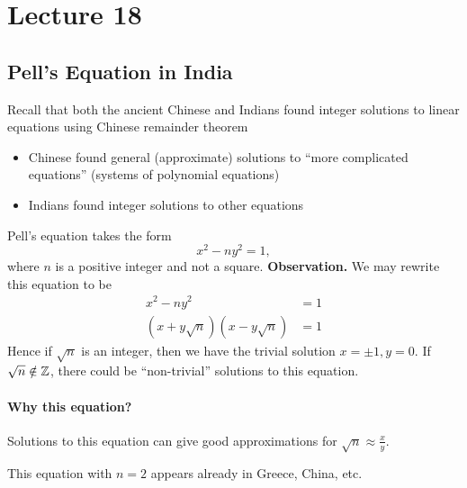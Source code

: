 \documentclass[class=article, crop=false]{standalone}
\begin{document}
  \section{Lecture 18}
  \subsection{Pell's Equation in India}
  Recall that both the ancient Chinese and Indians found integer solutions to linear equations using Chinese remainder theorem
  \begin{itemize}
    \item Chinese found general (approximate) solutions to ``more complicated equations'' (systems of polynomial equations)
    \item Indians found integer solutions to other equations
  \end{itemize}
  Pell's equation takes the form
  \[
    x^2 - ny^2 = 1,
  \]
  where $n$ is a positive integer and not a square.
  \textbf{Observation.} We may rewrite this equation to be
  \begin{align*}
    x^2 - ny^2 &= 1 \\
    (x + y\sqrt{n})(x - y\sqrt{n}) &= 1
  \end{align*}
  Hence if $\sqrt{n}$ is an integer, then we have the trivial solution $x = \pm 1, y = 0$. If $\sqrt{n}\notin \mathbb{Z}$, there could be ``non-trivial'' solutions to this equation.
  \paragraph{Why this equation?} \par
  Solutions to this equation can give good approximations for $\sqrt{n}\approx \frac{x}{y}$.
  \begin{note}{}
    This equation with $n = 2$ appears already in Greece, China, etc.
  \end{note}
\end{document}
